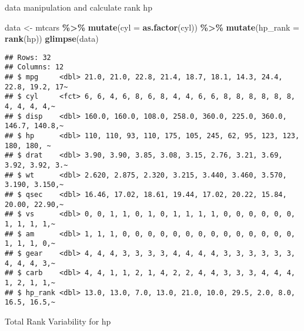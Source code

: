 \documentclass[
]{article}
\newenvironment{Shaded}{\begin{snugshade}}{\end{snugshade}}
\newcommand{\AttributeTok}[1]{\textcolor[rgb]{0.13,0.29,0.53}{#1}}
\newcommand{\DecValTok}[1]{\textcolor[rgb]{0.00,0.00,0.81}{#1}}
\newcommand{\FunctionTok}[1]{\textcolor[rgb]{0.13,0.29,0.53}{\textbf{#1}}}
\newcommand{\NormalTok}[1]{#1}
\newcommand{\OtherTok}[1]{\textcolor[rgb]{0.56,0.35,0.01}{#1}}
\newcommand{\SpecialCharTok}[1]{\textcolor[rgb]{0.81,0.36,0.00}{\textbf{#1}}}
\begin{document}
data manipulation and calculate rank hp

\begin{Shaded}
\begin{Highlighting}[]
\NormalTok{data }\OtherTok{\textless{}{-}}\NormalTok{ mtcars }\SpecialCharTok{\%\textgreater{}\%}
  \FunctionTok{mutate}\NormalTok{(}\AttributeTok{cyl =} \FunctionTok{as.factor}\NormalTok{(cyl)) }\SpecialCharTok{\%\textgreater{}\%}
  \FunctionTok{mutate}\NormalTok{(}\AttributeTok{hp\_rank =} \FunctionTok{rank}\NormalTok{(hp))}
\FunctionTok{glimpse}\NormalTok{(data)}
\end{Highlighting}
\end{Shaded}

\begin{verbatim}
## Rows: 32
## Columns: 12
## $ mpg     <dbl> 21.0, 21.0, 22.8, 21.4, 18.7, 18.1, 14.3, 24.4, 22.8, 19.2, 17~
## $ cyl     <fct> 6, 6, 4, 6, 8, 6, 8, 4, 4, 6, 6, 8, 8, 8, 8, 8, 8, 4, 4, 4, 4,~
## $ disp    <dbl> 160.0, 160.0, 108.0, 258.0, 360.0, 225.0, 360.0, 146.7, 140.8,~
## $ hp      <dbl> 110, 110, 93, 110, 175, 105, 245, 62, 95, 123, 123, 180, 180, ~
## $ drat    <dbl> 3.90, 3.90, 3.85, 3.08, 3.15, 2.76, 3.21, 3.69, 3.92, 3.92, 3.~
## $ wt      <dbl> 2.620, 2.875, 2.320, 3.215, 3.440, 3.460, 3.570, 3.190, 3.150,~
## $ qsec    <dbl> 16.46, 17.02, 18.61, 19.44, 17.02, 20.22, 15.84, 20.00, 22.90,~
## $ vs      <dbl> 0, 0, 1, 1, 0, 1, 0, 1, 1, 1, 1, 0, 0, 0, 0, 0, 0, 1, 1, 1, 1,~
## $ am      <dbl> 1, 1, 1, 0, 0, 0, 0, 0, 0, 0, 0, 0, 0, 0, 0, 0, 0, 1, 1, 1, 0,~
## $ gear    <dbl> 4, 4, 4, 3, 3, 3, 3, 4, 4, 4, 4, 3, 3, 3, 3, 3, 3, 4, 4, 4, 3,~
## $ carb    <dbl> 4, 4, 1, 1, 2, 1, 4, 2, 2, 4, 4, 3, 3, 3, 4, 4, 4, 1, 2, 1, 1,~
## $ hp_rank <dbl> 13.0, 13.0, 7.0, 13.0, 21.0, 10.0, 29.5, 2.0, 8.0, 16.5, 16.5,~
\end{verbatim}

Total Rank Variability for hp

\begin{Shaded}
\end{Shaded}
\end{document}
